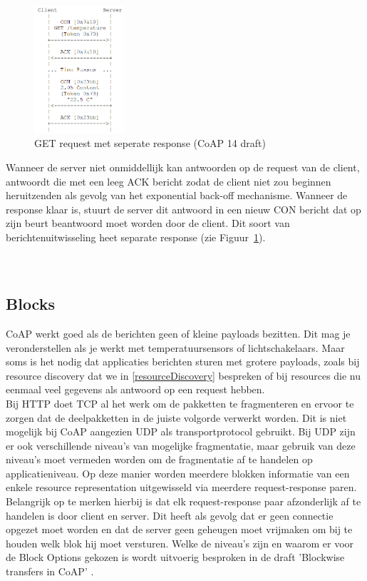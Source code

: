 \begin{figure}
\vspace{-40pt}
\includegraphics[width=0.3\textwidth]{fig/CoAPSeperateResponse}
\vspace{-30pt}
\caption{GET request met seperate response (CoAP 14 draft)}
\label{fig:SeparateResponse}
\vspace{-100pt}
\end{figure}
Wanneer de server niet onmiddellijk kan antwoorden op de request van de client, antwoordt die met een leeg ACK bericht zodat de client niet zou beginnen heruitzenden als gevolg van het exponential back-off mechanisme. Wanneer de response klaar is, stuurt de server dit antwoord in een nieuw CON bericht dat op zijn beurt beantwoord moet worden door de client. Dit soort van berichtenuitwisseling heet separate response (zie Figuur~\ref{fig:SeparateResponse}).
\\
\\
\\

\subsection{Blocks} \label{blocks}
CoAP werkt goed als de berichten geen of kleine payloads bezitten. Dit mag je veronderstellen als je werkt met temperatuursensors of lichtschakelaars. Maar soms is het nodig dat applicaties berichten sturen met grotere payloads, zoals bij resource discovery dat we in \ref{resourceDiscovery} bespreken of bij resources die nu eenmaal veel gegevens als antwoord op een request hebben.\\

Bij HTTP doet TCP al het werk om de pakketten te fragmenteren en ervoor te zorgen dat de deelpakketten in de juiste volgorde verwerkt worden. Dit is niet mogelijk bij CoAP aangezien UDP als transportprotocol gebruikt. Bij UDP zijn er ook verschillende niveau's van mogelijke fragmentatie, maar gebruik van deze niveau's moet vermeden worden om de fragmentatie af te handelen op applicatieniveau. Op deze manier worden meerdere blokken informatie van een enkele resource representation uitgewisseld via meerdere request-response paren. Belangrijk op te merken hierbij is dat elk request-response paar afzonderlijk af te handelen is door client en server. Dit heeft als gevolg dat er geen connectie opgezet moet worden en dat de server geen geheugen moet vrijmaken om bij te houden welk blok hij moet versturen. Welke de niveau's zijn en waarom er voor de Block Options gekozen is wordt uitvoerig besproken in de draft 'Blockwise transfers in CoAP' \cite{blockwiseTransfer}.

